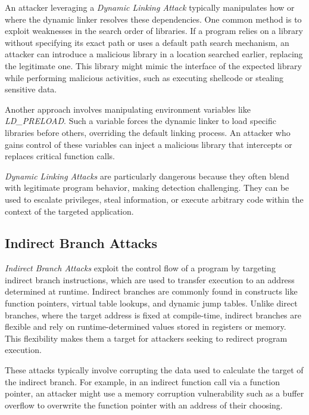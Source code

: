 An attacker leveraging a \textit{Dynamic Linking Attack} typically manipulates how
or where the dynamic linker resolves these dependencies. One common method is to
exploit weaknesses in the search order of libraries. If a program relies on a library
without specifying its exact path or uses a default path search mechanism, an
attacker can introduce a malicious library in a location searched earlier, replacing
the legitimate one. This library might mimic the interface of the expected
library while performing malicious activities, such as executing shellcode or stealing
sensitive data.

Another approach involves manipulating environment variables like \textit{LD\_PRELOAD}.
Such a variable forces the dynamic linker to load specific libraries before others,
overriding the default linking process. An attacker who gains control of these variables
can inject a malicious library that intercepts or replaces critical function calls.

\textit{Dynamic Linking Attacks} are particularly dangerous because they often
blend with legitimate program behavior, making detection challenging. They can
be used to escalate privileges, steal information, or execute arbitrary code
within the context of the targeted application.

\subsection{Indirect Branch Attacks}
\label{subsec:background_indirectbranch}

\textit{Indirect Branch Attacks} exploit the control flow of a program by
targeting indirect branch instructions, which are used to transfer execution to an
address determined at runtime. Indirect branches are commonly found in
constructs like function pointers, virtual table lookups, and dynamic jump
tables. Unlike direct branches, where the target address is fixed at compile-time,
indirect branches are flexible and rely on runtime-determined values stored in registers
or memory. This flexibility makes them a target for attackers seeking to
redirect program execution.

These attacks typically involve corrupting the data used to calculate the target
of the indirect branch. For example, in an indirect function call via a function
pointer, an attacker might use a memory corruption vulnerability such as a buffer
overflow to overwrite the function pointer with an address of their choosing.

